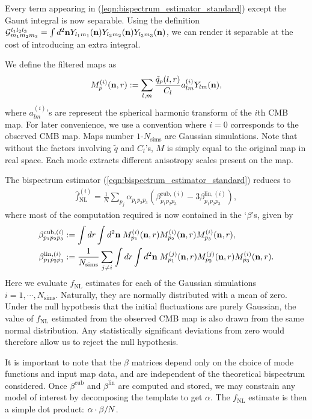 Every term appearing in (\ref{eqn:bispectrum_estimator_standard}) except the Gaunt integral is now separable. Using the definition $\mathcal{G}^{l_1 l_2 l_3}_{m_1 m_2 m_3} = \int d^2 \mathbf{n} Y_{l_1 m_1}(\mathbf{n}) Y_{l_2 m_2}(\mathbf{n}) Y_{l_3 m_3}(\mathbf{n})$, we can render it separable at the cost of introducing an extra integral.

We define the filtered maps as
\begin{align}
	M^{(i)}_p (\mathbf{n}, r) := \sum_{l,m} \frac{\tilde{q}_p (l,r)}{C_l} a^{(i)}_{lm} Y_{lm} (\mathbf{n}), \label{def:filtered_maps}
\end{align}
where $a^{(i)}_{lm}$'s are represent the spherical harmonic transform of the $i$th CMB map. For later convenience, we use a convention where $i=0$ corresponds to the observed CMB map. Maps number $1$-$N_\text{sims}$ are Gaussian simulations. Note that without the factors involving $\tilde{q}$ and $C_l$'s, $M$ is simply equal to the original map in real space. Each mode extracts different anisotropy scales present on the map.

The bispectrum estimator (\ref{eqn:bispectrum_estimator_standard}) reduces to
\begin{align}
	\hat{f}_\text{NL}^{(i)} = \frac{1}{N} \sum_{p_j} \alpha_{p_1 p_2 p_3} (\beta^{\textrm{cub},(i)}_{p_1 p_2 p_3} - 3 \beta^{\textrm{lin},(i)}_{p_1 p_2 p_3}), \label{eqn:fNL_from_betas}
\end{align}
where most of the computation required is now contained in the `$\beta$'s, given by
\begin{align}
	\beta^{\textrm{cub},(i)}_{p_1 p_2 p_3} &:= \int dr \int d^2\mathbf{n} \; M^{(i)}_{p_1} (\mathbf{n},r) M^{(i)}_{p_2} (\mathbf{n},r) M^{(i)}_{p_3} (\mathbf{n},r),	\label{def:beta_cubic} \\
	\beta^{\textrm{lin},(i)}_{p_1 p_2 p_3} &:= \frac{1}{N_\text{sims}} \sum_{j \neq i} \int dr \int d^2\mathbf{n} \; M^{(j)}_{p_1} (\mathbf{n},r) M^{(j)}_{p_2} (\mathbf{n},r) M^{(i)}_{p_3} (\mathbf{n},r). \label{def:beta_linear}
\end{align}
Here we evaluate $f_\text{NL}$ estimates for each of the Gaussian simulations $i=1,\cdots,N_\text{sims}$. Naturally, they are normally distributed with a mean of zero. Under the null hypothesis that the initial fluctuations are purely Gaussian, the value of $f_\text{NL}$ estimated from the observed CMB map is also drawn from the same normal distribution. Any statistically significant deviations from zero would therefore allow us to reject the null hypothesis.

It is important to note that the $\beta$ matrices depend only on the choice of mode functions and input map data, and are independent of the theoretical bispectrum considered. Once $\beta^\text{cub}$ and $\beta^\text{lin}$ are computed and stored, we may constrain any model of interest by decomposing the template to get $\alpha$. The $f_\text{NL}$ estimate is then  a simple dot product: $\mathbf{\alpha} \cdot \mathbf{\beta} / N$.

